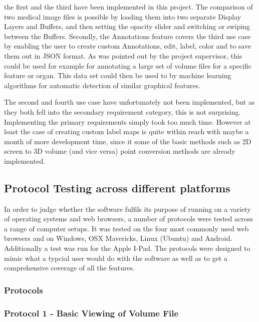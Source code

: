 \documentclass[a4paper,11pt,twoside]{article}
\begin{document}
the first and the third have been implemented in this project. The comparison of two medical image files is possible by loading them into two separate Display Layers and Buffers, and then setting the opacity slider and switching or swiping between the Buffers. Secondly, the Annotations feature covers the third use case by enabling the user to create custom Annotations, edit, label, color and to save them out in JSON format. As was pointed out by the project supervisor, this could be used for example for annotating a large set of volume files for a specific feature or organ. This data set could then be used to by machine learning algorithms for automatic detection of similar graphical features.

The second and fourth use case have unfortunately not been implemented, but as they both fell into the secondary requirement category, this is not surprising. Implementing the primary requirements simply took too much time. However at least the case of creating custom label maps is quite within reach with maybe a month of more development time, since it some of the basic methods such as 2D screen to 3D volume (and vice versa) point conversion methods are already implemented.




\subsection{Protocol Testing across different platforms}

In order to judge whether the software fulfils its purpose of running on a variety of operating systems and web browsers, a number of protocols were tested across a range of computer setups. It was tested on the four most commonly used web browsers and on Windows, OSX Mavericks, Linux (Ubuntu) and Android. Additionally a test was run for the Apple I-Pad. The protocols were designed to mimic what a typcial user would do with the software as well as to get a comprehensive coverage of all the features.


\subsubsection{Protocols}

\subsubsection*{Protocol 1 - Basic Viewing of Volume File }
\end{document}
